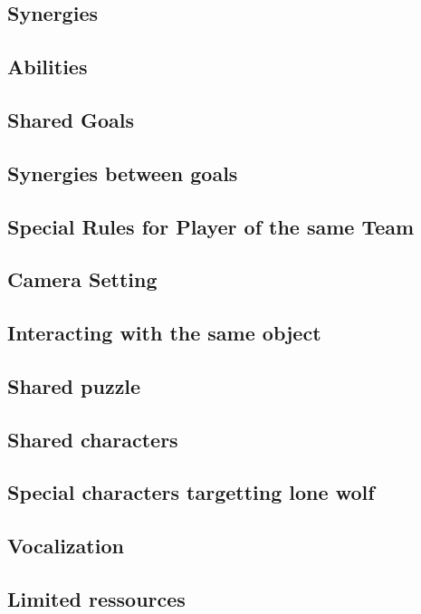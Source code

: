 \subsection{Synergies}

\subsection{Abilities}

\subsection{Shared Goals}

\subsection{Synergies between goals}

\subsection{Special Rules for Player of the same Team}

\subsection{Camera Setting}

\subsection{Interacting with the same object}

\subsection{Shared puzzle}

\subsection{Shared characters}

\subsection{Special characters targetting lone wolf}

\subsection{Vocalization}

\subsection{Limited ressources}

